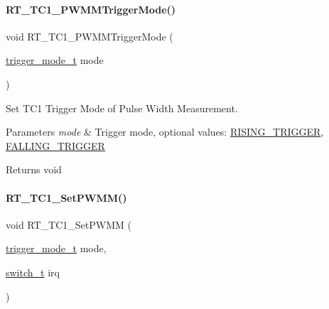 \paragraph{\texorpdfstring{R\+T\+\_\+\+T\+C1\+\_\+\+P\+W\+M\+M\+Trigger\+Mode()}{RT\_TC1\_PWMMTriggerMode()}}
{\footnotesize\ttfamily void R\+T\+\_\+\+T\+C1\+\_\+\+P\+W\+M\+M\+Trigger\+Mode (\begin{DoxyParamCaption}\item[{\mbox{\hyperlink{a00020_a6d33f21be3f0c5cf91c5d638e8aca086}{trigger\+\_\+mode\+\_\+t}}}]{mode }\end{DoxyParamCaption})\hspace{0.3cm}{\ttfamily [inline]}}



Set T\+C1 Trigger Mode of Pulse Width Measurement. 


\begin{DoxyParams}{Parameters}
{\em mode} & Trigger mode, optional values\+: \mbox{\hyperlink{a00020_a6d33f21be3f0c5cf91c5d638e8aca086a60a109ab1ab372f4e3935064a3f0a26c}{R\+I\+S\+I\+N\+G\+\_\+\+T\+R\+I\+G\+G\+ER}}, \mbox{\hyperlink{a00020_a6d33f21be3f0c5cf91c5d638e8aca086a75134708fc2093222ca5a56acefc5d3f}{F\+A\+L\+L\+I\+N\+G\+\_\+\+T\+R\+I\+G\+G\+ER}} \\
\hline
\end{DoxyParams}
\begin{DoxyReturn}{Returns}
void 
\end{DoxyReturn}
\mbox{\label{a00044_a2a6a9244dcaf4b6bf36ac604fce52dbf}} 
\paragraph{\texorpdfstring{R\+T\+\_\+\+T\+C1\+\_\+\+Set\+P\+W\+M\+M()}{RT\_TC1\_SetPWMM()}}
{\footnotesize\ttfamily void R\+T\+\_\+\+T\+C1\+\_\+\+Set\+P\+W\+MM (\begin{DoxyParamCaption}\item[{\mbox{\hyperlink{a00020_a6d33f21be3f0c5cf91c5d638e8aca086}{trigger\+\_\+mode\+\_\+t}}}]{mode,  }\item[{\mbox{\hyperlink{a00020_ab43e533f3793920486fb81c580f71564}{switch\+\_\+t}}}]{irq }\end{DoxyParamCaption})\hspace{0.3cm}{\ttfamily [inline]}}



